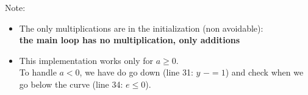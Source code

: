 \documentclass[a4paper,10pt]{article}
\begin{document}
\bigskip \noindent
Note:
\begin{itemize}
	\item The only multiplications are in the initialization (non avoidable): \\
	 \textbf{the main loop has no multiplication, only additions}
	\item This implementation works only for $a \ge 0$. 
	\\To handle $a < 0$, we have do go down (line 31: $y$ $-$$= 1$) and check when we go below the curve (line 34: $e \le 0$).
\end{itemize}
\end{document}
